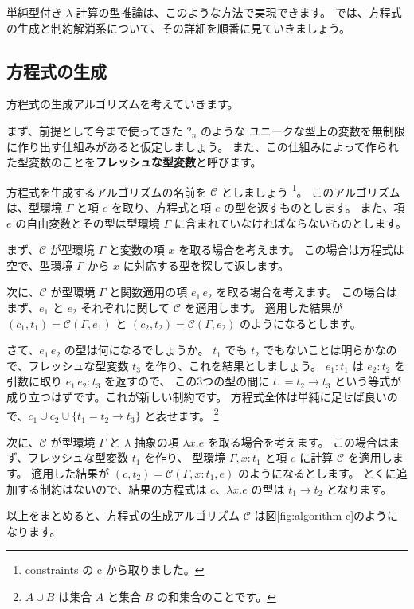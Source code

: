 単純型付き $\lambda$ 計算の型推論は、このような方法で実現できます。
では、方程式の生成と制約解消系について、その詳細を順番に見ていきましょう。

\subsection{方程式の生成}

方程式の生成アルゴリズムを考えていきます。

まず、前提として今まで使ってきた $?_n$ のような
ユニークな型上の変数を無制限に作り出す仕組みがあると仮定しましょう。
また、この仕組みによって作られた型変数のことを\textbf{フレッシュな型変数}と呼びます。

方程式を生成するアルゴリズムの名前を $\mathcal C$ としましょう
\footnote{constraints の c から取りました。}。
このアルゴリズムは、型環境 $\Gamma$ と項 $e$ を取り、方程式と項 $e$ の型を返すものとします。
また、項 $e$ の自由変数とその型は型環境 $\Gamma$ に含まれていなければならないものとします。

まず、$\mathcal C$ が型環境 $\Gamma$ と変数の項 $x$ を取る場合を考えます。
この場合は方程式は空で、型環境 $\Gamma$ から $x$ に対応する型を探して返します。

次に、$\mathcal C$ が型環境 $\Gamma$ と関数適用の項 $e_1 \, e_2$ を取る場合を考えます。
この場合はまず、$e_1$ と $e_2$ それぞれに関して $\mathcal C$ を適用します。
適用した結果が $(c_1, t_1) = \mathcal{C}(\Gamma, e_1)$ と $(c_2, t_2) = \mathcal{C}(\Gamma, e_2)$
のようになるとします。

さて、$e_1 \, e_2$ の型は何になるでしょうか。
$t_1$ でも $t_2$ でもないことは明らかなので、フレッシュな型変数 $t_3$ を作り、これを結果としましょう。
$e_1 : t_1$ は $e_2 : t_2$ を引数に取り $e_1 \, e_2 : t_3$ を返すので、
この3つの型の間に $t_1 = t_2 \to t_3$ という等式が成り立つはずです。これが新しい制約です。
方程式全体は単純に足せば良いので、$c_1 \cup c_2 \cup \{t_1 = t_2 \to t_3\}$ と表せます。
\footnote{$A \cup B$ は集合 $A$ と集合 $B$ の和集合のことです。}

次に、$\mathcal C$ が型環境 $\Gamma$ と $\lambda$ 抽象の項 $\lambda x . e$ を取る場合を考えます。
この場合はまず、フレッシュな型変数 $t_1$ を作り、
型環境 $\Gamma, x : t_1$ と項 $e$ に計算 $\mathcal C$ を適用します。
適用した結果が $(c, t_2) = \mathcal{C}(\Gamma, x : t_1, e)$ のようになるとします。
とくに追加する制約はないので、結果の方程式は $c$、$\lambda x . e$ の型は $t_1 \to t_2$ となります。

以上をまとめると、方程式の生成アルゴリズム $\mathcal C$ は図\ref{fig:algorithm-c}のようになります。

